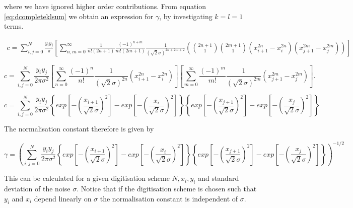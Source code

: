 \documentclass[apj]{emulateapj}
\begin{document}
where we have ignored higher order contributions. From equation \ref{eq:dcompleteklsum} we obtain an expression for $\gamma$, by investigating $k=l=1$ terms.

\begin{equation}
\begin{aligned}
c = \sum_{i,j=0}^N  \frac{y_i y_j}{\pi} \left[ \sum_{n,m = 0}^\infty \frac{1}{n! (2n+1)} \frac{(-1)^{n+m}}{m! (2m+1)} \frac{1}{(\sqrt{2}\sigma)^{2n+2m+2}} \left( {2n+1 \choose 1} {2m+1 \choose 1} ( x_{i+1}^{2n} - x_{i}^{2n} ) ( x_{j+1}^{2m} - x_{j}^{2m} ) \right) \right]
\end{aligned}
\end{equation}

\begin{equation}
c = \sum_{i,j=0}^N \frac{y_i y_j}{2\pi\sigma^2} \left[ \sum_{n = 0}^\infty \frac{(-1)^n}{n!} \frac{1}{(\sqrt{2}\sigma)^{2n}}  ( x_{i+1}^{2n} - x_{i}^{2n} ) \right] \left[ \sum_{m = 0}^\infty \frac{(-1)^m}{m!} \frac{1}{(\sqrt{2}\sigma)^{2m}} ( x_{j+1}^{2m} - x_{j}^{2m} ) \right].
\end{equation}

\begin{equation}
c = \sum_{i,j=0}^N \frac{y_i y_j}{2\pi\sigma^2} \left\{ exp \left[ - \left(\frac{x_{i+1}}{\sqrt{2}\sigma} \right)^2 \right] - exp \left[ - \left(\frac{x_{i}}{\sqrt{2}\sigma} \right)^2 \right] \right\} \left\{ exp \left[ - \left(\frac{x_{j+1}}{\sqrt{2}\sigma} \right)^2 \right] - exp \left[ - \left(\frac{x_{j}}{\sqrt{2}\sigma} \right)^2 \right] \right\}
\end{equation}

The normalisation constant therefore is given by

\begin{equation}
\gamma = \left( \sum_{i,j=0}^N \frac{y_i y_j}{2\pi\sigma^2} \left\{ exp \left[ - \left(\frac{x_{i+1}}{\sqrt{2}\sigma} \right)^2 \right] - exp \left[ - \left(\frac{x_{i}}{\sqrt{2}\sigma} \right)^2 \right] \right\} \left\{ exp \left[ - \left(\frac{x_{j+1}}{\sqrt{2}\sigma} \right)^2 \right] - exp \left[ - \left(\frac{x_{j}}{\sqrt{2}\sigma} \right)^2 \right] \right\} \right)^{-1/2}
\end{equation}

This can be calculated for a given digitisation scheme $N, x_i, y_i$ and standard deviation of the noise $\sigma$. Notice that if the digitisation scheme is chosen such that $y_i$ and $x_i$ depend linearly on $\sigma$ the normalisation constant is independent of $\sigma$.


\newpage


\end{document}
